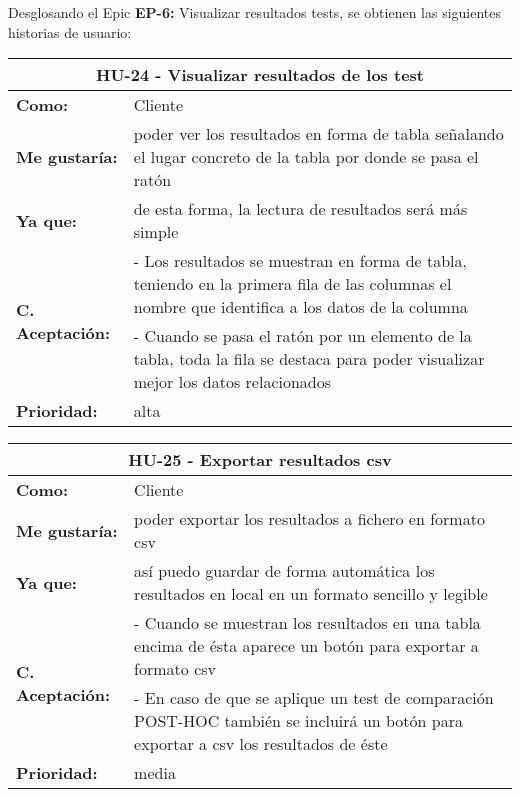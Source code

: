 
Desglosando el Epic \textbf{EP-6:} Visualizar resultados tests, se obtienen las siguientes historias de usuario:

\begin{table}[H]
	\begin{tabular}{| p{3cm}| p{11cm} |}
		\hline
		\multicolumn{2}{|c|}{\textbf{HU-24} - Visualizar resultados de los test} \\ \hline
		\textbf{Como:} & Cliente \\ \hline
		\textbf{Me gustaría:} & poder ver los resultados en forma de tabla señalando el lugar concreto de la tabla por donde se pasa el ratón \\ \hline
		\textbf{Ya que:} & de esta forma, la lectura de resultados será más simple \\ \hline
		\multirow{2}{11cm}{\textbf{C. Aceptación:}} & - Los resultados se muestran en forma de tabla, teniendo en la primera fila de las columnas el nombre que identifica a los datos de la columna \\
		& - Cuando se pasa el ratón por un elemento de la tabla, toda la fila se destaca para poder visualizar mejor los datos relacionados \\ \hline
		\textbf{\textbf{Prioridad:}} & alta \\ \hline
	\end{tabular}
\end{table}


\begin{table}[H]
	\begin{tabular}{| p{3cm}| p{11cm} |}
		\hline
		\multicolumn{2}{|c|}{\textbf{HU-25} - Exportar resultados csv} \\ \hline
		\textbf{Como:} & Cliente \\ \hline
		\textbf{Me gustaría:} & poder exportar los resultados a fichero en formato csv \\ \hline
		\textbf{Ya que:} & así puedo guardar de forma automática los resultados en local en un formato sencillo y legible \\ \hline
		\multirow{2}{11cm}{\textbf{C. Aceptación:}} & - Cuando se muestran los resultados en una tabla encima de ésta aparece un botón para exportar a formato csv \\
		& - En caso de que se aplique un test de comparación POST-HOC también se incluirá un botón para exportar a csv los resultados de éste \\ \hline
		\textbf{\textbf{Prioridad:}} & media \\ \hline
	\end{tabular}
\end{table}


